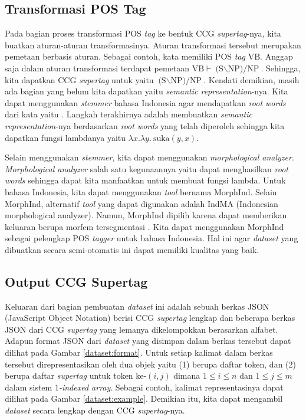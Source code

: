 \subsection{Transformasi POS Tag}

Pada bagian proses transformasi POS \textit{tag} ke bentuk CCG \textit{supertag}-nya,
kita buatkan aturan-aturan transformasinya.
Aturan transformasi tersebut merupakan pemetaan berbasis aturan.
Sebagai contoh, kata  memiliki POS \textit{tag} $\text{VB}$.
Anggap saja dalam aturan transformasi terdapat pemetaan $\text{VB} \vdash \text{(S$\backslash$NP)/NP}$.
Sehingga, kita dapatkan CCG \textit{supertag} untuk  yaitu $\text{(S$\backslash$NP)/NP}$.
Kendati demikian, masih ada bagian yang belum kita dapatkan yaitu \textit{semantic representation}-nya.
Kita dapat menggunakan \textit{stemmer} bahasa Indonesia agar mendapatkan \textit{root words}
dari kata  yaitu .
Langkah terakhirnya adalah membuatkan \textit{semantic representation}-nya berdasarkan
\textit{root words} yang telah diperoleh sehingga kita dapatkan fungsi lambdanya yaitu
$\lambda x.\lambda y.\ \text{suka}(y, x)$.

Selain menggunakan \textit{stemmer}, kita dapat menggunakan \textit{morphological analyzer}.
\textit{Morphological analyzer} salah satu kegunaannya yaitu dapat menghasilkan \textit{root words}
sehingga dapat kita manfaatkan untuk membuat fungsi lambda.
Untuk bahasa Indonesia, kita dapat menggunakan \textit{tool} bernama MorphInd\footnotemark[3].
Selain MorphInd, alternatif \textit{tool} yang dapat digunakan adalah IndMA
(Indonesian morphological analyzer).
Namun, MorphInd dipilih karena dapat memberikan keluaran berupa morfem tersegmentasi
\cite{larasati2011indonesian}.
Kita dapat menggunakan MorphInd sebagai pelengkap POS \textit{tagger} untuk bahasa Indonesia.
Hal ini agar \textit{dataset} yang dibuatkan secara semi-otomatis ini dapat memiliki kualitas yang
baik.



\subsection{Output CCG Supertag}

Keluaran dari bagian pembuatan \textit{dataset} ini adalah sebuah berkas JSON
(JavaScript Object Notation) berisi CCG \textit{supertag} lengkap dan beberapa berkas JSON dari CCG
\textit{supertag} yang lemanya dikelompokkan berasarkan alfabet.
Adapun format JSON dari \textit{dataset} yang disimpan dalam berkas tersebut dapat dilihat pada Gambar
\ref{dataset:format}.
Untuk setiap kalimat dalam berkas tersebut direpresentasikan oleh dua objek yaitu
(1)  berupa daftar token, dan
(2)  berupa daftar \textit{supertag} untuk token ke-$(i, j)$ dimana $1 \leq i \leq n$
dan $1 \leq j \leq m$ dalam sistem \textit{$1$-indexed array}.
Sebagai contoh, kalimat  representasinya dapat dilihat pada Gambar
\ref{dataset:example}.
Demikian itu, kita dapat mengambil \textit{dataset} secara lengkap dengan CCG \textit{supertag}-nya.

